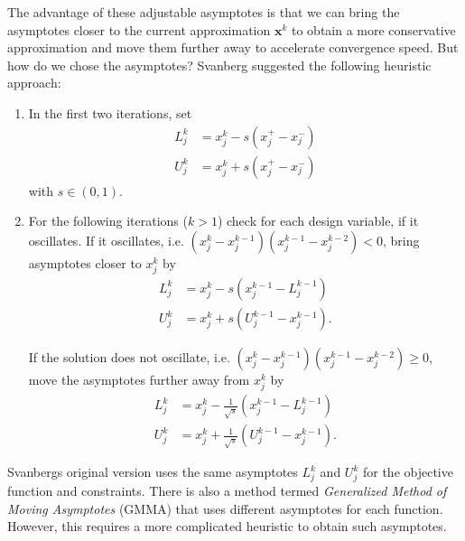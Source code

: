 The advantage of these adjustable asymptotes is that we can bring the asymptotes closer to the current approximation $\mathbf{x}^k$ to obtain a more conservative approximation and move them further away to accelerate convergence speed. But how do we chose the asymptotes? Svanberg \cite{Svanberg1987} suggested the following heuristic approach: 
\begin{enumerate}
    \item In the first two iterations, set 
        \begin{align}
            L_j^k &= x_j^k - s (x^+_j - x^-_j) \\
            U^k_j &= x_j^k + s (x^+_j - x^-_j)
        \end{align}
    with $s \in (0,1)$.
    \item For the following iterations ($k>1$) check for each design variable, if it oscillates. If it oscillates, i.e. $(x_j^k-x_j^{k-1})(x_j^{k-1}-x_j^{k-2}) < 0$, bring asymptotes closer to $x_j^k$ by   
        \begin{align}            
            \label{eq:mma_heuristic_first}
            L_j^k &= x_j^k - s (x_j^{k-1} - L_j^{k-1}) \\
            U_j^k &= x_j^k + s (U_j^{k-1} - x_j^{k-1}).
        \end{align}

    If the solution does not oscillate, i.e. $(x_j^k-x_j^{k-1})(x_j^{k-1}-x_j^{k-2}) \ge 0$, move the asymptotes further away from $x_j^k$ by   
        \begin{align}
            L_j^k &= x_j^k - \frac{1}{\sqrt{s}} (x_j^{k-1} - L_j^{k-1}) \\
            U_j^k &= x_j^k + \frac{1}{\sqrt{s}} (U_j^{k-1} - x_j^{k-1}).
            \label{eq:mma_heuristic_last}
        \end{align}
\end{enumerate}

Svanbergs original version uses the same asymptotes $L_j^k$ and $U_j^k$ for the objective function and constraints. There is also a method termed \emph{Generalized Method of Moving Asymptotes} (GMMA) \cite{Zhang1997} that uses different asymptotes for each function. However, this requires a more complicated heuristic to obtain such asymptotes.

